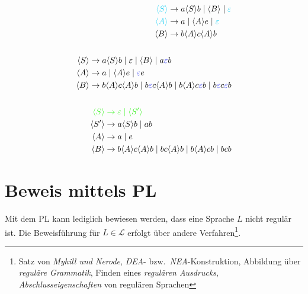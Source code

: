 \documentclass[a4paper,parskip=half,footsepline=on,headings=normal,titlepage=false]{scrartcl}
\newcommand{\nt}[1]{\langle \uppercase{#1} \rangle}
\renewcommand{\epsilon}{\varepsilon}
\begin{document}
\begin{subequations}
	\begin{align}
		\label{eq:epsilon:1_search}
		\begin{split}
			\color{c1}\nt{S} & \to a \nt{S} b \mid \nt{B} \mid \color{c1}\epsilon \\
			\color{c1}\nt{A} & \to a \mid \nt{A}e \mid \color{c1}\epsilon \\
			\nt{B} & \to b\nt{A}c\nt{A}b
		\end{split}
		\\ \nonumber \\
		\label{eq:epsilon:2_elemination}
		\begin{split}
			\nt{S} & \to a \nt{S} b \mid \epsilon \mid \nt{B} \mid a{\color{c2}\epsilon}b \\
			\nt{A} & \to a \mid \nt{A}e \mid {\color{c2}\epsilon}e \\
			\nt{B} & \to b\nt{A}c\nt{A}b \mid b{\color{c2}\epsilon}c\nt{A}b \mid b\nt{A}c{\color{c2}\epsilon}b \mid b{\color{c2}\epsilon}c{\color{c2}\epsilon}b
		\end{split}
		\\ \nonumber \\
		\label{eq:epsilon:3_isolation}
		\begin{split}
			\color{c3}\nt{S} & \color{c3}\to \epsilon \mid \nt{S'} \\
			\nt{S'} & \to a \nt{S} b \mid ab \\
			\nt{A} & \to a \mid e \\
			\nt{B} & \to b\nt{A}c\nt{A}b \mid bc\nt{A}b \mid b\nt{A}cb \mid bcb
		\end{split}
	\end{align}
\end{subequations}

\section{Beweis mittels \acl{PL}}
Mit dem \ac{PL} kann lediglich bewiesen werden, dass eine Sprache $L$ nicht regulär ist.
Die Beweisführung für $L \in \mathcal{L}$ erfolgt über andere Verfahren\footnote{Satz von \emph{Myhill und Nerode}, \emph{\acs{DEA}}- bzw.\ \emph{\acs{NEA}}-Konstruktion, Abbildung über \emph{reguläre Grammatik}, Finden eines \emph{regulären Ausdrucks}, \emph{Abschlusseigenschaften} von regulären Sprachen}.
\end{document}
